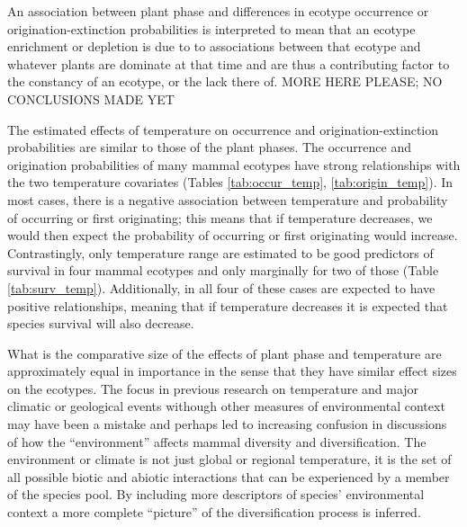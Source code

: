 \documentclass[12pt,letterpaper]{article}
\begin{document}
An association between plant phase and differences in ecotype occurrence or origination-extinction probabilities is interpreted to mean that an  ecotype enrichment or depletion is due to to associations between that ecotype and whatever plants are dominate at that time and are thus a contributing factor to the constancy of an ecotype, or the lack there of. \uppercase{more here please; no conclusions made yet}



The estimated effects of temperature on occurrence and origination-extinction probabilities are similar to those of the plant phases. The occurrence and origination probabilities of many mammal ecotypes have strong relationships with the two temperature covariates (Tables \ref{tab:occur_temp}, \ref{tab:origin_temp}). In most cases, there is a negative association between temperature and probability of occurring or first originating; this means that if temperature decreases, we would then expect the probability of occurring or first originating would increase. Contrastingly, only temperature range are estimated to be good predictors of survival in four mammal ecotypes and only marginally for two of those (Table \ref{tab:surv_temp}). Additionally, in all four of these cases are expected to have positive relationships, meaning that if temperature decreases it is expected that species survival will also decrease.



What is the comparative size of the effects of plant phase and temperature are approximately equal in importance in the sense that they have similar effect sizes on the ecotypes. The focus in previous research on temperature and major climatic or geological events withough other measures of environmental context may have been a mistake and perhaps led to increasing confusion in discussions of how the ``environment'' affects mammal diversity and diversification. The environment or climate is not just global or regional temperature, it is the set of all possible biotic and abiotic interactions that can be experienced by a member of the species pool. By including more descriptors of species' environmental context a more complete ``picture'' of the diversification process is inferred.
\end{document}
